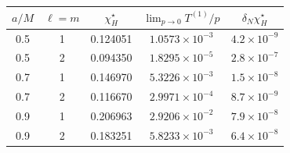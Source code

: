 \documentclass[UTF8,fontset=fandol,12pt,a4paper,oneside,openany]{ctexrep}
\begin{document}
\noindent\begin{minipage}{\linewidth}
\captionsetup{type=table}\caption{历史超辐射阈值响应与能流斜率，待端点修正重算。}\label{audit:tab:superradiant}
\centering\fontsize{10.5}{14}\selectfont
\setlength{\tabcolsep}{6pt}\renewcommand{\arraystretch}{1.2}
\begin{tabular}{ccccc}\toprule
$a/M$ & $\ell=m$ & $\chi_H^\star$ & $\displaystyle\lim_{p\to0}T^{(1)}/p$ & $\delta_N\chi_H^\star$\\\midrule
0.5 & 1 & 0.124051 & $1.0573\times10^{-3}$ & $4.2\times10^{-9}$\\
0.5 & 2 & 0.094350 & $1.8295\times10^{-5}$ & $2.8\times10^{-7}$\\
0.7 & 1 & 0.146970 & $5.3226\times10^{-3}$ & $1.5\times10^{-8}$\\
0.7 & 2 & 0.116670 & $2.9971\times10^{-4}$ & $8.7\times10^{-9}$\\
0.9 & 1 & 0.206963 & $2.9206\times10^{-2}$ & $7.9\times10^{-8}$\\
0.9 & 2 & 0.183251 & $5.8233\times10^{-3}$ & $6.4\times10^{-8}$\\
\bottomrule\end{tabular}
\end{minipage}\par\addvspace{10pt}
\par\addvspace{14pt}
\end{document}
